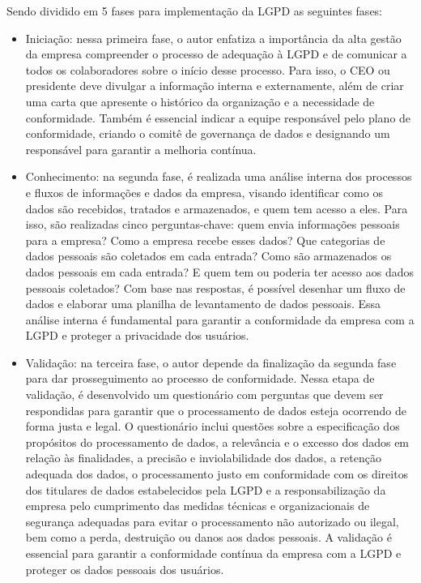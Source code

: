 \documentclass[
	12pt,				%
	openright,			%
	oneside,			%
	a4paper,			%
	english,			%
	french,				%
	spanish,			%
	brazil,				%
	]{abntex2}
\begin{document}
Sendo dividido em 5 fases para implementação da LGPD as seguintes fases: 
\begin{itemize}
\item Iniciação: nessa primeira fase, o autor enfatiza a importância da alta gestão da empresa compreender o processo de adequação à LGPD e de comunicar a todos os colaboradores sobre o início desse processo. Para isso, o CEO ou presidente deve divulgar a informação interna e externamente, além de criar uma carta que apresente o histórico da organização e a necessidade de conformidade. Também é essencial indicar a equipe responsável pelo plano de conformidade, criando o comitê de governança de dados e designando um responsável para garantir a melhoria contínua.
\item  Conhecimento: na segunda fase, é realizada uma análise interna dos processos e fluxos de informações e dados da empresa, visando identificar como os dados são recebidos, tratados e armazenados, e quem tem acesso a eles. Para isso, são realizadas cinco perguntas-chave: quem envia informações pessoais para a empresa? Como a empresa recebe esses dados? Que categorias de dados pessoais são coletados em cada entrada? Como são armazenados os dados pessoais em cada entrada? E quem tem ou poderia ter acesso aos dados pessoais coletados? Com base nas respostas, é possível desenhar um fluxo de dados e elaborar uma planilha de levantamento de dados pessoais. Essa análise interna é fundamental para garantir a conformidade da empresa com a LGPD e proteger a privacidade dos usuários.
\item Validação: na terceira fase, o autor depende da finalização da segunda fase para dar prosseguimento ao processo de conformidade. Nessa etapa de validação, é desenvolvido um questionário com perguntas que devem ser respondidas para garantir que o processamento de dados esteja ocorrendo de forma justa e legal. O questionário inclui questões sobre a especificação dos propósitos do processamento de dados, a relevância e o excesso dos dados em relação às finalidades, a precisão e inviolabilidade dos dados, a retenção adequada dos dados, o processamento justo em conformidade com os direitos dos titulares de dados estabelecidos pela LGPD e a responsabilização da empresa pelo cumprimento das medidas técnicas e organizacionais de segurança adequadas para evitar o processamento não autorizado ou ilegal, bem como a perda, destruição ou danos aos dados pessoais. A validação é essencial para garantir a conformidade contínua da empresa com a LGPD e proteger os dados pessoais dos usuários.


\end{itemize}
\end{document}
